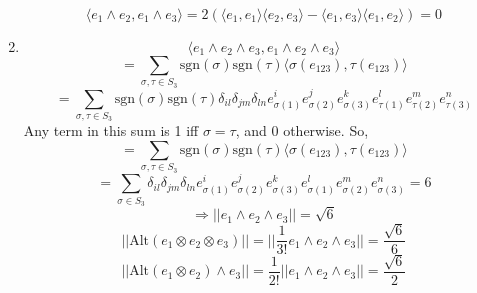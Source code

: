 \documentclass{article}
\begin{document}
\begin{enumerate}
    \[\langle e_1 \wedge e_2, e_1\wedge e_3\rangle = 2(\langle e_1,e_1\rangle \langle e_2, e_3\rangle - \langle e_1, e_3\rangle \langle e_1, e_2\rangle) = 0\]
    \item
    \[\langle e_1 \wedge e_2 \wedge e_3,e_1 \wedge e_2 \wedge e_3 \rangle \]
    \[ = \sum_{\sigma,\tau \in S_3} \mathrm{sgn}(\sigma)\mathrm{sgn}(\tau)\langle \sigma(e_{123}),\tau(e_{123})\rangle\]
    \[=\sum_{\sigma,\tau \in S_3} \mathrm{sgn}(\sigma)\mathrm{sgn}(\tau)\delta_{il}\delta_{jm}\delta_{ln}e_{\sigma(1)}^i e_{\sigma(2)}^j e_{\sigma(3)}^k e_{\tau(1)}^l e_{\tau(2)}^m e_{\tau(3)}^n\]
    Any term in this sum is 1 iff $\sigma = \tau$, and 0 otherwise. So,
    \[ = \sum_{\sigma,\tau \in S_3} \mathrm{sgn}(\sigma)\mathrm{sgn}(\tau)\langle \sigma(e_{123}),\tau(e_{123})\rangle\]
    \[=\sum_{\sigma\in S_3}\delta_{il}\delta_{jm}\delta_{ln}e_{\sigma(1)}^i e_{\sigma(2)}^j e_{\sigma(3)}^k e_{\sigma(1)}^l e_{\sigma(2)}^m e_{\sigma(3)}^n = 6\]
    \[\Rightarrow ||e_1 \wedge e_2 \wedge e_3|| = \sqrt{6}\]
    \[||\mathrm{Alt}(e_1\otimes e_2 \otimes e_3)|| = ||\frac{1}{3!} e_1 \wedge e_2 \wedge e_3|| = \frac{\sqrt{6}}{6}\]
    \[||\mathrm{Alt}(e_1\otimes e_2)\wedge e_3|| = \frac{1}{2!}||e_1 \wedge e_2 \wedge e_3|| = \frac{\sqrt{6}}{2}\]
\end{enumerate}
\end{document}
